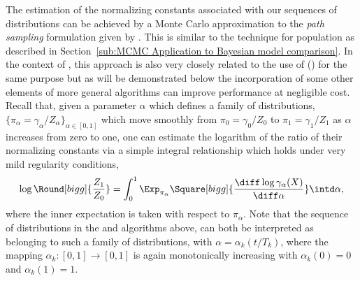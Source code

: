 The estimation of the normalizing constants associated with our sequences of distributions can be achieved by a Monte Carlo approximation to the \emph{path sampling} formulation given by \cite{Gelman:1998ei}. This is similar to the technique for population \mcmc as described in Section~\ref{sub:MCMC Application to Bayesian model comparison}. In the context of \smc, this approach is also very closely related to the use of  (\ais) for the same purpose \cite{Neal:2001we} but as will be demonstrated below the incorporation of some other elements of more general \smc algorithms can improve performance at negligible cost. Recall that, given a parameter $\alpha$ which defines a family of distributions, $\{\pi_{\alpha} = \gamma_{\alpha} / Z_\alpha\}_{\alpha \in [0,1]}$ which move smoothly from $\pi_0 = \gamma_0 / Z_0$ to $\pi_1 = \gamma_1 / Z_1$ as $\alpha$ increases from zero to one, one can estimate the logarithm of the ratio of their normalizing constants via a simple integral relationship which holds under very mild regularity conditions,
\begin{equation*}
  \log\Round[bigg]{\frac{Z_1}{Z_0}} =
  \int_{0}^{1} \Exp_{\pi_\alpha} \Square[bigg]{
    \frac{\diff\log\gamma_{\alpha}(X)}{\diff\alpha}
  } \intd\alpha,
\end{equation*}
where the inner expectation is taken with respect to $\pi_{\alpha}$. Note that the sequence of distributions in the \smc[2] and \smc[3] algorithms above, can both be interpreted as belonging to such a family of distributions, with $\alpha = \alpha_k(t/T_k)$, where the mapping $\alpha_k:[0,1]\to[0,1]$ is again monotonically increasing with $\alpha_k(0) = 0$ and $\alpha_k(1) = 1$.

